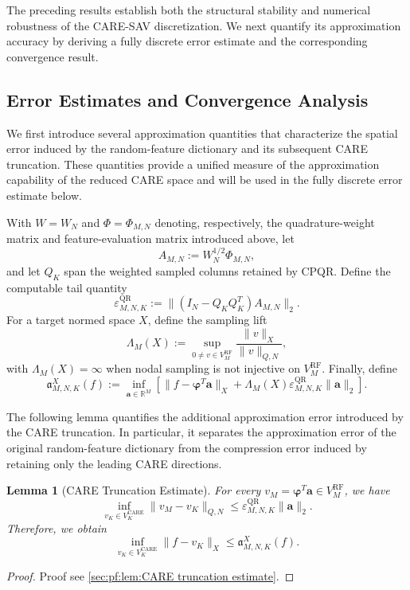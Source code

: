 \documentclass[10pt,reqno]{amsart}
\newtheorem{lmm}{\bf Lemma}
\newenvironment{lemma}{\begin{lmm}}{\end{lmm}}
\theoremstyle{remark}
\theoremstyle{definition}
\begin{document}
The preceding results establish both the structural stability and numerical robustness of the CARE-SAV discretization. We next quantify its approximation accuracy by deriving a fully discrete error estimate and the corresponding convergence result.

\subsection{Error Estimates and Convergence Analysis}
We first introduce several approximation quantities that characterize the spatial error induced by the random-feature dictionary and its subsequent CARE truncation. These quantities provide a unified measure of the approximation capability of the reduced CARE space and will be used in the fully discrete error estimate below.

With $W=W_N$ and $\Phi=\Phi_{M,N}$ denoting, respectively, the quadrature-weight matrix and feature-evaluation matrix introduced above, let
$$A_{M,N}:=W_N^{1/2}\Phi_{M,N},$$
and let $Q_K$ span the weighted sampled columns retained by CPQR. Define the computable tail quantity
$$\varepsilon_{M,N,K}^{\mathrm{QR}}:=\|(I_N-Q_K Q_K^{T})A_{M,N}\|_2.$$
For a target normed space $X$, define the sampling lift
$$\Lambda_M(X):=\sup_{0\ne v\in V_M^{\mathrm{RF}}}\frac{\|v\|_X}{\|v\|_{Q,N}},$$
with $\Lambda_M(X)=\infty$ when nodal sampling is not injective on $V_M^{\mathrm{RF}}$. Finally, define
$$\mathfrak a_{M,N,K}^{X}(f):=\inf_{\boldsymbol a\in\mathbb R^M}\left[\|f-\boldsymbol\varphi^{T}\boldsymbol a\|_X+\Lambda_M(X)\varepsilon_{M,N,K}^{\mathrm{QR}}\|\boldsymbol a\|_2\right].$$

The following lemma quantifies the additional approximation error introduced by the CARE truncation. In particular, it separates the approximation error of the original random-feature dictionary from the compression error induced by retaining only the leading CARE directions.
\begin{lemma}[CARE Truncation Estimate]
\label{lem:CARE truncation estimate}
  For every $v_M=\boldsymbol\varphi^{T}\boldsymbol a\in V_M^{\mathrm{RF}}$, we have
  \begin{equation}
  \label{eq:main1_lem1}
    \inf_{v_K\in V_K^{\mathrm{CARE}}}\|v_M-v_K\|_{Q,N}\le\varepsilon_{M,N,K}^{\mathrm{QR}}\|\boldsymbol a\|_2.
  \end{equation}
  Therefore, we obtain
  \begin{equation}
  \label{eq:main2_lem1}
    \inf_{v_K\in V_K^{\mathrm{CARE}}}\|f-v_K\|_X \le\mathfrak a_{M,N,K}^{X}(f).
  \end{equation}
\end{lemma}
\begin{proof}
  Proof see \cref{sec:pf:lem:CARE truncation estimate}.
\end{proof}
\end{document}
